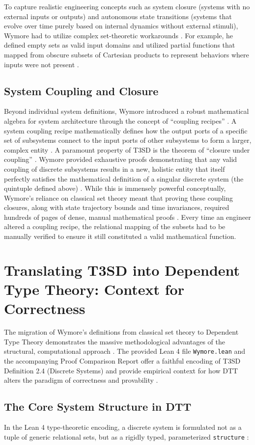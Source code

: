 \documentclass[11pt]{article}
\begin{document}
To capture realistic engineering concepts such as system closure (systems with no external inputs or outputs) and autonomous state transitions (systems that evolve over time purely based on internal dynamics without external stimuli), Wymore had to utilize complex set-theoretic workarounds \parencite{Ref13, Ref27}. For example, he defined empty sets as valid input domains and utilized partial functions that mapped from obscure subsets of Cartesian products to represent behaviors where inputs were not present \parencite{Ref27}.\subsection{System Coupling and Closure}
Beyond individual system definitions, Wymore introduced a robust mathematical algebra for system architecture through the concept of ``coupling recipes'' \parencite{Ref14, Ref36, Ref37}. A system coupling recipe mathematically defines how the output ports of a specific set of subsystems connect to the input ports of other subsystems to form a larger, complex entity \parencite{Ref13, Ref38}. A paramount property of T3SD is the theorem of ``closure under coupling'' \parencite{Ref36}. Wymore provided exhaustive proofs demonstrating that any valid coupling of discrete subsystems results in a new, holistic entity that itself perfectly satisfies the mathematical definition of a singular discrete system (the quintuple defined above) \parencite{Ref13, Ref36}. While this is immensely powerful conceptually, Wymore's reliance on classical set theory meant that proving these coupling closures, along with state trajectory bounds and time invariances, required hundreds of pages of dense, manual mathematical proofs \parencite{Ref37}. Every time an engineer altered a coupling recipe, the relational mapping of the subsets had to be manually verified to ensure it still constituted a valid mathematical function.

\section{Translating T3SD into Dependent Type Theory: Context for Correctness}

The migration of Wymore's definitions from classical set theory to Dependent Type Theory demonstrates the massive methodological advantages of the structural, computational approach \parencite{Ref27}. The provided Lean 4 file \texttt{Wymore.lean} and the accompanying Proof Comparison Report offer a faithful encoding of T3SD Definition 2.4 (Discrete Systems) and provide empirical context for how DTT alters the paradigm of correctness and provability \parencite{Ref23, Ref23}.\subsection{The Core System Structure in DTT}
In the Lean 4 type-theoretic encoding, a discrete system is formulated not as a tuple of generic relational sets, but as a rigidly typed, parameterized \texttt{structure} \parencite{Ref27}:
\end{document}
